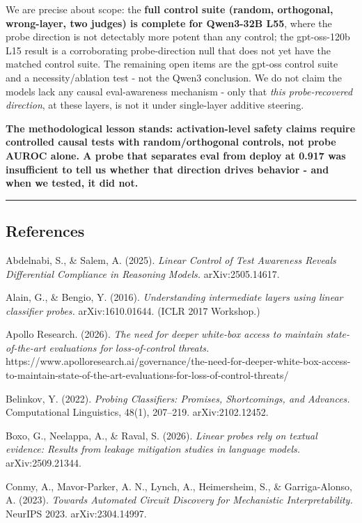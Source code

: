 \documentclass[
]{article}
\begin{document}
We are precise about scope: the \textbf{full control suite (random,
orthogonal, wrong-layer, two judges) is complete for Qwen3-32B L55},
where the probe direction is not detectably more potent than any
control; the gpt-oss-120b L15 result is a corroborating probe-direction
null that does not yet have the matched control suite. The remaining
open items are the gpt-oss control suite and a necessity/ablation test -
not the Qwen3 conclusion. We do not claim the models lack any causal
eval-awareness mechanism - only that \emph{this probe-recovered
direction}, at these layers, is not it under single-layer additive
steering.

\textbf{The methodological lesson stands: activation-level safety claims
require controlled causal tests with random/orthogonal controls, not
probe AUROC alone. A probe that separates eval from deploy at 0.917 was
insufficient to tell us whether that direction drives behavior - and
when we tested, it did not.}

\begin{center}\rule{0.5\linewidth}{0.5pt}\end{center}

\subsection{References}\label{references}

Abdelnabi, S., \& Salem, A. (2025). \emph{Linear Control of Test
Awareness Reveals Differential Compliance in Reasoning Models.}
arXiv:2505.14617.

Alain, G., \& Bengio, Y. (2016). \emph{Understanding intermediate layers
using linear classifier probes.} arXiv:1610.01644. (ICLR 2017 Workshop.)

Apollo Research. (2026). \emph{The need for deeper white-box access to
maintain state-of-the-art evaluations for loss-of-control threats.}
https://www.apolloresearch.ai/governance/the-need-for-deeper-white-box-access-to-maintain-state-of-the-art-evaluations-for-loss-of-control-threats/

Belinkov, Y. (2022). \emph{Probing Classifiers: Promises, Shortcomings,
and Advances.} Computational Linguistics, 48(1), 207--219.
arXiv:2102.12452.

Boxo, G., Neelappa, A., \& Raval, S. (2026). \emph{Linear probes rely on
textual evidence: Results from leakage mitigation studies in language
models.} arXiv:2509.21344.

Conmy, A., Mavor-Parker, A. N., Lynch, A., Heimersheim, S., \&
Garriga-Alonso, A. (2023). \emph{Towards Automated Circuit Discovery for
Mechanistic Interpretability.} NeurIPS 2023. arXiv:2304.14997.
\end{document}
